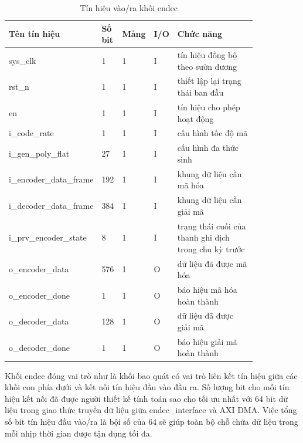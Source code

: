 \documentclass[../DoAn.tex]{subfiles}
\begin{document}
\begin{table}[H]
\centering{}
    \caption{Tín hiệu vào/ra khối endec}
    \begin{tabular}{|p{0.28\linewidth}|p{0.08\linewidth}|p{0.08\linewidth}|p{0.05\linewidth}|p{0.35\linewidth}|}
        \hline
        \textbf{Tên tín hiệu} & \textbf{Số bit}  & \textbf{Mảng}     & \textbf{I/O}   & \textbf{Chức năng} \\ \hline\hline
        sys\_clk  & 1   & 1     & I     & tín hiệu đồng bộ theo sườn dương \\ \hline
        rst\_n    & 1   & 1     & I     & thiết lập lại trạng thái ban đầu\\ \hline
        en        & 1   & 1     & I     & tín hiệu cho phép hoạt động \\ \hline
        i\_code\_rate  & 1   & 1     & I     & cấu hình tốc độ mã \\ \hline
        i\_gen\_poly\_flat  & 27   & 1     & I     & cấu hình đa thức sinh \\ \hline
        i\_encoder\_data\_frame  & 192   & 1     & I     & khung dữ liệu cần mã hóa \\ \hline
        i\_decoder\_data\_frame  & 384   & 1     & I     & khung dữ liệu cần giải mã \\ \hline
        i\_prv\_encoder\_state  & 8   & 1     & I     & trạng thái cuối của thanh ghi dịch trong chu kỳ trước \\ \hline
        o\_encoder\_data  & 576   & 1     & O     & dữ liệu đã được mã hóa \\ \hline
        o\_encoder\_done  & 1   & 1     & O     & báo hiệu mã hóa hoàn thành \\ \hline
        o\_decoder\_data  & 128   & 1     & O     & dữ liệu đã được giải mã \\ \hline
        o\_decoder\_done  & 1   & 1     & O     & báo hiệu giải mã hoàn thành \\ \hline
        \end{tabular}
\end{table}

Khối endec đóng vai trò như là khối bao quát có vai trò liên kết tín hiệu giữa các khối con phía dưới và kết nối tín hiệu đầu vào đầu ra. Số lượng bit cho mỗi tín hiệu kết nối đã được người thiết kế tính toán sao cho tối ưu nhất với 64 bit dữ liệu trong giao thức truyền dữ liệu giữa endec\_interface và AXI DMA. Việc tổng số bit tín hiệu đầu vào/ra là bội số của 64 sẽ giúp toàn bộ chỗ chứa dữ liệu trong mỗi nhịp thời gian được tận dụng tối đa.
\end{document}
